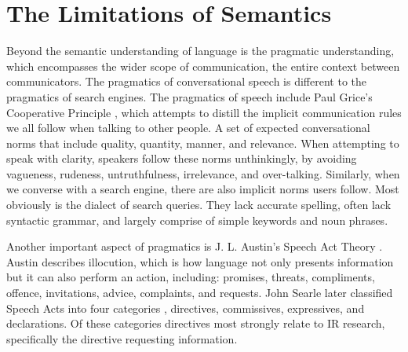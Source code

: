 
\section{The Limitations of Semantics}
Beyond the semantic understanding of language is the pragmatic understanding, which encompasses the wider scope of communication, the entire context between communicators. The pragmatics of conversational speech is different to the pragmatics of search engines. The pragmatics of speech include Paul Grice's Cooperative Principle \cite{grice1975logic}, which attempts to distill the implicit communication rules we all follow when talking to other people. A set of expected conversational norms that include quality, quantity, manner, and relevance. When attempting to speak with clarity, speakers follow these norms unthinkingly, by avoiding vagueness, rudeness, untruthfulness, irrelevance, and over-talking. Similarly, when we converse with a search engine, there are also implicit norms users follow. Most obviously is the dialect of search queries. They lack accurate spelling, often lack syntactic grammar, and largely comprise of simple keywords and noun phrases.

Another important aspect of pragmatics is J. L. Austin's Speech Act Theory \cite{austin1975things}. Austin describes illocution, which is how language not only presents information but it can also perform an action, including: promises, threats, compliments, offence, invitations, advice, complaints, and requests. John Searle later classified Speech Acts into four categories \cite{searle1976classification}, directives, commissives, expressives, and declarations. Of these categories directives most strongly relate to IR research, specifically the directive requesting information.


